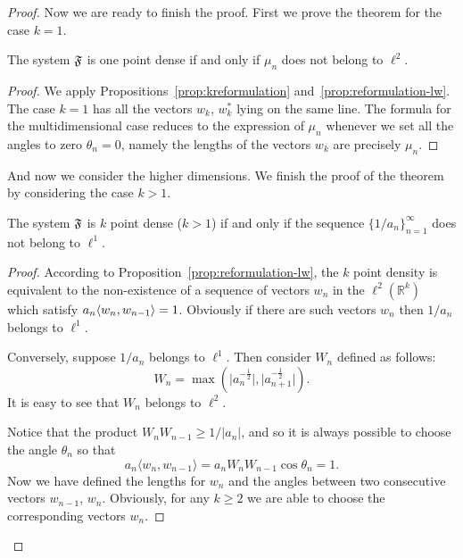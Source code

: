 \begin{proof}
    Now we are ready to finish the proof.
    First we prove the theorem for the case $k=1$.
    \begin{prop}
      The system $\mathfrak{F}$ is one point dense if and only if $\mu_n$ does not belong to $\ell^2$.
    \end{prop}
    \begin{proof}
      We apply Propositions~\ref{prop:kreformulation} and~\ref{prop:reformulation-lw}.
      The case $k=1$ has all the vectors $w_k$, $w^*_k$ lying on the same line.
      The formula for the multidimensional case reduces to the expression of $\mu_n$ whenever we set all the angles to zero $\theta_n = 0$,
        namely the lengths of the vectors $w_k$ are precisely $\mu_n$.
    \end{proof}

    And now we consider the higher dimensions.
    We finish the proof of the theorem by considering the case $k > 1$.
    \begin{prop}
      The system $\mathfrak{F}$ is $k$ point dense ($k > 1$) if and only if the sequence $\{1/a_n\}_{n=1}^\infty$ does not belong to $\ell^1$.
    \end{prop}
    \begin{proof}
      According to Proposition~\ref{prop:reformulation-lw}, the $k$ point density is equivalent to the non-existence of
        a sequence of vectors $w_n$ in the $\ell^2(\mathbb{R}^k)$ which satisfy $a_n \langle w_n, w_{n-1} \rangle = 1$.
      Obviously if there are such vectors $w_n$ then $1/a_n$ belongs to $\ell^1$.

      Conversely, suppose $1/a_n$ belongs to $\ell^1$.
      Then consider $W_n$ defined as follows:
      \[
        W_n = \max(\lvert a_n^{-\frac{1}{2}} \rvert, \lvert a^{-\frac{1}{2}}_{n+1}\rvert).
      \]
      It is easy to see that $W_n$ belongs to $\ell^2$.

      Notice that the product $W_nW_{n-1} \geq 1/\lvert a_n\rvert$, and so it is always possible to choose the angle $\theta_n$ so that
      \[
        a_n \langle w_n, w_{n-1} \rangle = a_n W_n W_{n-1}\cos{\theta_n} = 1.
      \]
      Now we have defined the lengths for $w_n$ and the angles between two consecutive vectors $w_{n-1}$, $w_n$.
      Obviously, for any $k \geq 2$ we are able to choose the corresponding vectors $w_n$.
    \end{proof}
  \end{proof}

